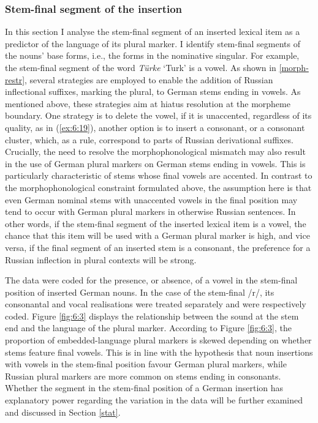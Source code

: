 \subsubsection{Stem-final segment of the insertion}

\noindent In this section I analyse the stem-final segment of an inserted lexical item as a predictor of the language of its plural marker. I identify stem-final segments of the nouns’ base forms, i.e., the forms in the nominative singular. For example, the stem-final segment of the word \textit{Türke} `Turk' is a vowel. As shown in \ref{morph-restr}, several strategies are employed to enable the addition of Russian inflectional suffixes, marking the plural, to German stems ending in vowels. As mentioned above, these strategies aim at hiatus resolution at the morpheme boundary. One strategy is to delete the vowel, if it is unaccented, regardless of its quality, as in (\ref{ex:6:19}), another option is to insert a consonant, or a consonant cluster, which, as a rule, correspond to parts of Russian derivational suffixes. Crucially, the need to resolve the morphophonological mismatch may also result in the use of German plural markers on German stems ending in vowels. This is particularly characteristic of stems whose final vowels are accented. In contrast to the morphophonological constraint formulated above, the assumption here is that even German nominal stems with unaccented vowels in the final position may tend to occur with German plural markers in otherwise Russian sentences. In other words, if the stem-final segment of the inserted lexical item is a vowel, the chance that this item will be used with a German plural marker is high, and vice versa, if the final segment of an inserted stem is a consonant, the preference for a Russian inflection in plural contexts will be strong.

The data were coded for the presence, or absence, of a vowel in the stem-final position of inserted German nouns. In the case of the stem-final /r/, its consonantal and vocal realisations were treated separately and were respectively coded. Figure \ref{fig:6:3} displays the relationship between the sound at the stem end and the language of the plural marker. According to Figure \ref{fig:6:3}, the proportion of embedded-language plural markers is skewed depending on whether stems feature final vowels. This is in line with the hypothesis that noun insertions with vowels in the stem-final position favour German plural markers, while Russian plural markers are more common on stems ending in consonants. Whether the segment in the stem-final position of a German insertion has explanatory power regarding the variation in the data will be further examined and discussed in Section \ref{stat}.

